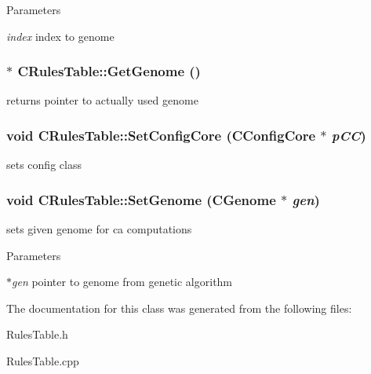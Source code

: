 \begin{DoxyParams}{Parameters}
\item[{\em index}]index to genome \end{DoxyParams}
\hypertarget{classCRulesTable_a738f12d423fa1b145f50131336ac0273}{
\subsubsection[{GetGenome}]{ $\ast$ CRulesTable::GetGenome ()}}
\label{classCRulesTable_a738f12d423fa1b145f50131336ac0273}
returns pointer to actually used genome \hypertarget{classCRulesTable_a8f4653c3a4b576ce88635d60f268e6ad}{
\subsubsection[{SetConfigCore}]{\setlength{\rightskip}{0pt plus 5cm}void CRulesTable::SetConfigCore ({\bf CConfigCore} $\ast$ {\em pCC})}}
\label{classCRulesTable_a8f4653c3a4b576ce88635d60f268e6ad}
sets config class \hypertarget{classCRulesTable_a5bb7c61954a40c04ded5010accf1cdb1}{
\subsubsection[{SetGenome}]{\setlength{\rightskip}{0pt plus 5cm}void CRulesTable::SetGenome ({\bf CGenome} $\ast$ {\em gen})}}
\label{classCRulesTable_a5bb7c61954a40c04ded5010accf1cdb1}
sets given genome for ca computations


\begin{DoxyParams}{Parameters}
\item[{\em $\ast$gen}]pointer to genome from genetic algorithm \end{DoxyParams}


The documentation for this class was generated from the following files:\begin{DoxyCompactItemize}
\item 
RulesTable.h\item 
RulesTable.cpp\end{DoxyCompactItemize}
